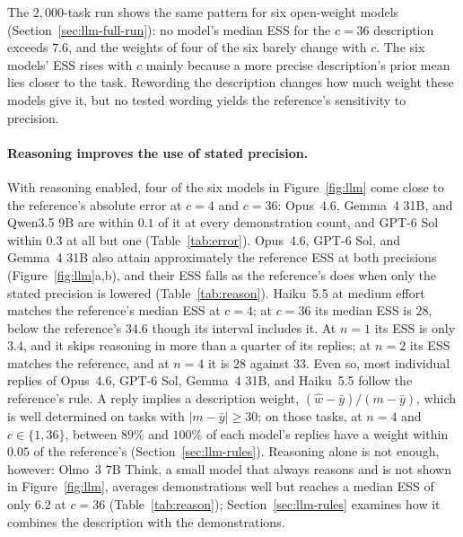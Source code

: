 The $2{,}000$-task run shows the same pattern for six open-weight models (Section~\ref{sec:llm-full-run}): no model's median ESS for the $c=36$ description exceeds $7.6$, and the weights of four of the six barely change with $c$. The six models' ESS rises with $c$ mainly because a more precise description's prior mean lies closer to the task. Rewording the description changes how much weight these models give it, but no tested wording yields the reference's sensitivity to precision.

\paragraph{Reasoning improves the use of stated precision.}
With reasoning enabled, four of the six models in Figure~\ref{fig:llm} come close to the reference's absolute error at $c=4$ and $c=36$: Opus~4.6, Gemma~4 31B, and Qwen3.5 9B are within $0.1$ of it at every demonstration count, and GPT-6 Sol within $0.3$ at all but one (Table~\ref{tab:error}). Opus~4.6, GPT-6 Sol, and Gemma~4 31B also attain approximately the reference ESS at both precisions (Figure~\ref{fig:llm}a,b), and their ESS falls as the reference's does when only the stated precision is lowered (Table~\ref{tab:reason}). Haiku~5.5 at medium effort matches the reference's median ESS at $c=4$; at $c=36$ its median ESS is $28$, below the reference's $34.6$ though its interval includes it. At $n=1$ its ESS is only $3.4$, and it skips reasoning in more than a quarter of its replies; at $n=2$ its ESS matches the reference, and at $n=4$ it is $28$ against $33$. Even so, most individual replies of Opus~4.6, GPT-6 Sol, Gemma~4 31B, and Haiku~5.5 follow the reference's rule. A reply implies a description weight, $(\hat w-\bar y)/(m-\bar y)$, which is well determined on tasks with $|m-\bar y|\geq30$; on those tasks, at $n=4$ and $c\in\{1,36\}$, between $89\%$ and $100\%$ of each model's replies have a weight within $0.05$ of the reference's (Section~\ref{sec:llm-rules}). Reasoning alone is not enough, however: Olmo~3 7B Think, a small model that always reasons and is not shown in Figure~\ref{fig:llm}, averages demonstrations well but reaches a median ESS of only $6.2$ at $c=36$ (Table~\ref{tab:reason}); Section~\ref{sec:llm-rules} examines how it combines the description with the demonstrations.

